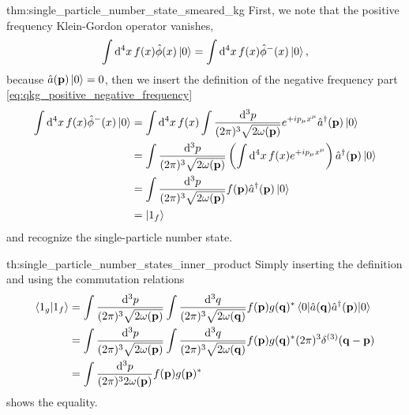 \begin{delayedproof}{thm:single_particle_number_state_smeared_kg}
	First, we note that the positive frequency Klein-Gordon operator vanishes,
	\begin{equation*}
		\int\dd[4]{x}
		f(x)
		\hat\phi(x)
		\ket{0}
		=
		\int\dd[4]{x}
		f(x)
		\hat\phi^-(x)
		\ket{0}
		,
	\end{equation*}
	because $\hat{a}(\vb{p})\ket{0}=0$, then we insert the definition of the negative frequency part \cref{eq:qkg_positive_negative_frequency}
	\begin{equation*}
		\begin{split}
			\int\dd[4]{x}
			f(x)
			\hat\phi^-(x)
			\ket{0}
			&=
			\int\dd[4]{x}
			f(x)
			\int\frac{\dd[3]{p}}{(2\pi)^3\sqrt{2\omega(\vb{p})}}
			e^{+ip_\mu x^\mu}
			\hat{a}^\dagger(\vb{p})
			\ket{0}
			\\
			&=
			\int\frac{\dd[3]{p}}{(2\pi)^3\sqrt{2\omega(\vb{p})}}
			\left(
				\int\dd[4]{x}
				f(x)
				e^{+ip_\mu x^\mu}
			\right)
			\hat{a}^\dagger(\vb{p})
			\ket{0}
			\\
			&=
			\int\frac{\dd[3]{p}}{(2\pi)^3\sqrt{2\omega(\vb{p})}}
			f(\vb{p})
			\hat{a}^\dagger(\vb{p})
			\ket{0}
			\\
			&=
			\ket{1_f}
		\end{split}
	\end{equation*}
	and recognize the single-particle number state.
\end{delayedproof}
\begin{delayedproof}{th:single_particle_number_states_inner_product}
	Simply inserting the definition and using the commutation relations
	\begin{equation*}
		\begin{split}
			\bra{1_g}\ket{1_f}
			&=
			\int\frac{\dd[3]{p}}{(2\pi)^3\sqrt{2\omega(\vb{p})}}
			\int\frac{\dd[3]{q}}{(2\pi)^3\sqrt{2\omega(\vb{q})}}
			f(\vb{p})g(\vb{q})^*
			\expval{\hat{a}(\vb{q})\hat{a}^\dagger(\vb{p})}{0}
			\\
			&=
			\int\frac{\dd[3]{p}}{(2\pi)^3\sqrt{2\omega(\vb{p})}}
			\int\frac{\dd[3]{q}}{(2\pi)^3\sqrt{2\omega(\vb{q})}}
			f(\vb{p})g(\vb{q})^*
			(2\pi)^3\delta^{(3)}(\vb{q}-\vb{p})
			\\
			&=
			\int\frac{\dd[3]{p}}{(2\pi)^32\omega(\vb{p})}
			f(\vb{p})g(\vb{p})^*
		\end{split}
	\end{equation*}
	shows the equality.
\end{delayedproof}
